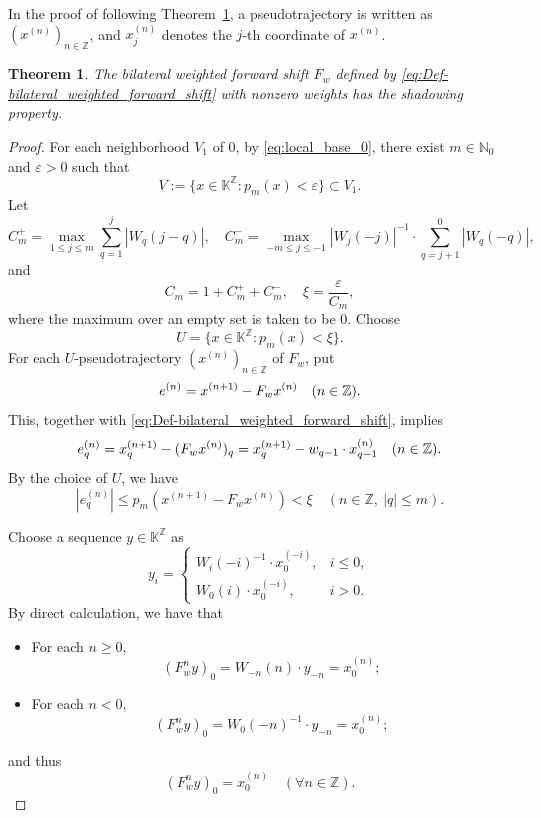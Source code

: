 \documentclass[11pt]{amsart}
\newtheorem{theorem}{Theorem}
\theoremstyle{definition}
\theoremstyle{remark}
\theoremstyle{plain}
\begin{document}
In the proof of following
Theorem~\ref{thm:omega-weighted-shift-shadowing}, a
pseudotrajectory is written as \((x^{(n)})_{n\in\mathbb{Z}}\), and
\(x_j^{(n)}\) denotes the \(j\)-th coordinate of \(x^{(n)}\).

\begin{theorem}\label{thm:omega-weighted-shift-shadowing}
The bilateral weighted forward shift \(F_w\) defined by
\eqref{eq:Def-bilateral_weighted_forward_shift} with nonzero
weights has the shadowing property.
\end{theorem}

\begin{proof}
For each neighborhood $V_1$ of $0$, by \eqref{eq:local_base_0},
there exist $m\in\mathbb{N}_0$ and $\varepsilon>0$ such that
\[
V:=\{x\in\mathbb{K}^{\mathbb{Z}}:p_m(x)<\varepsilon\}\subset V_1.
\]
Let
\[
C_m^+
=
\max_{1\le j\le m}\sum_{q=1}^{j}|W_q(j-q)|,
\quad
C_m^-
=
\max_{-m\le j\le -1}
|W_j(-j)|^{-1}\cdot \sum_{q=j+1}^{0}|W_q(-q)|,
\]
and
\[
C_m=1+C_m^{+}+C_m^{-},
\quad
\xi=\frac{\varepsilon}{C_m},
\]
where the maximum over an empty set is taken to be \(0\). Choose
\[
U=\{x\in\mathbb{K}^{\mathbb{Z}}:p_m(x)<\xi\}.
\]
For each \(U\)-pseudotrajectory \((x^{(n)})_{n\in\mathbb{Z}}\)
of \(F_w\), put
\begin{equation}\label{eq:Def_e^{n}}
e^{(n)}=x^{(n+1)}-F_{w}x^{(n)}
\quad(n\in\mathbb{Z}).
\end{equation}
This, together with \eqref{eq:Def-bilateral_weighted_forward_shift}, implies
\begin{equation}\label{eq:Def_e_q^{n}}
e_q^{(n)}=x^{(n+1)}_q-(F_{w}x^{(n)})_{q}=
x^{(n+1)}_q-w_{q-1}\cdot x^{(n)}_{q-1}
\quad(n\in\mathbb{Z}).
\end{equation}
By the choice of \(U\), we have
\begin{equation}\label{eq:e_q-Upper-Bound}
|e_q^{(n)}|\leq p_{m}(x^{(n+1)}-F_{w}x^{(n)})<\xi
\quad(n\in\mathbb{Z},\ |q|\le m).
\end{equation}

Choose a sequence \(y\in\mathbb{K}^{\mathbb{Z}}\) as
\[
y_i=
\begin{cases}
W_i(-i)^{-1}\cdot x^{(-i)}_0, & i\le0,\\
W_0(i)\cdot x^{(-i)}_0, & i>0.
\end{cases}
\]
By direct calculation, we have that
\begin{itemize}
  \item For each \(n\geq 0\),
\[
(F_w^n y)_0=W_{-n}(n)\cdot y_{-n}=x^{(n)}_0;
\]
  \item For each \(n<0\),
\[
(F_w^n y)_0=W_0(-n)^{-1}\cdot y_{-n}=x^{(n)}_0;
\]
\end{itemize}
and thus
\begin{equation}\label{eq:F_w^n(y)_0}
(F_w^n y)_0=x^{(n)}_0
\quad(\forall n\in\mathbb{Z}).
\end{equation}


\end{proof}
\end{document}

